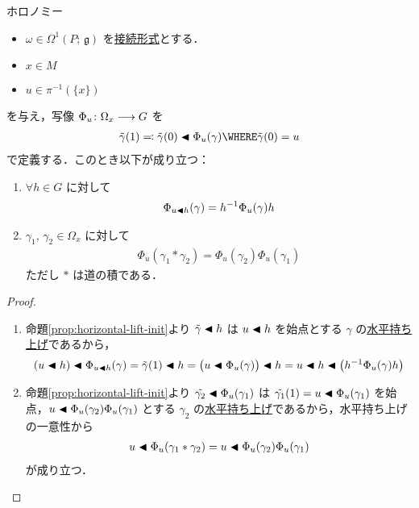 \documentclass[TQFT_main]{subfiles}
\begin{document}
\begin{myprop}[label=prop:holonomy]{ホロノミー}
    \begin{itemize}
        \item $\omega \in \Omega^1(P;\, \mathfrak{g})$ を\hyperref[def:connection]{接続形式}とする．
        \item $x \in M$
        \item $u \in \pi^{-1}(\{x\})$
    \end{itemize}
    を与え，写像 $\Phi_u \colon \Omega_x \longrightarrow G$ を
    \begin{align}
        \tilde{\gamma}(1) \eqqcolon \tilde{\gamma}(0) \btl \Phi_u (\gamma) \WHERE \tilde{\gamma}(0) = u
    \end{align}
    で定義する．このとき以下が成り立つ：
    \begin{enumerate}
        \item $\forall h \in G$ に対して
        \begin{align}
            \Phi_{u \blacktriangleleft h} (\gamma) = h^{-1} \Phi_u (\gamma) h
        \end{align}
        \item $\gamma_1,\, \gamma_2 \in \Omega_x$ に対して
        \begin{align}
            \Phi_u (\gamma_1 * \gamma_2) = \Phi_u (\gamma_2) \Phi_u (\gamma_1)
        \end{align}
        ただし $*$ は道の積である．
    \end{enumerate}
\end{myprop}

\begin{proof}
    \begin{enumerate}
        \item 命題\ref{prop:horizontal-lift-init}より $\tilde{\gamma} \blacktriangleleft h$ は $u \blacktriangleleft h$ を始点とする $\gamma$ の\hyperref[def:horizontal-lift-curve]{水平持ち上げ}であるから，
        \begin{align}
            (u \blacktriangleleft h) \blacktriangleleft \Phi_{u \blacktriangleleft h}(\gamma) = \tilde{\gamma} (1) \blacktriangleleft h = \bigl(u \blacktriangleleft \Phi_u(\gamma)\bigr) \blacktriangleleft h = u \blacktriangleleft h \blacktriangleleft \bigl( h^{-1} \Phi_u (\gamma) h \bigr) 
        \end{align}
        \item 命題\ref{prop:horizontal-lift-init}より $\tilde{\gamma_2} \blacktriangleleft \Phi_u(\gamma_1)$ は $\tilde{\gamma_1}(1) = u \blacktriangleleft \Phi_u(\gamma_1)$ を始点，$u \blacktriangleleft \Phi_u(\gamma_2) \Phi_u(\gamma_1)$ とする $\gamma_2$ の\hyperref[def:horizontal-lift-curve]{水平持ち上げ}であるから，水平持ち上げの一意性から
        \begin{align}
            u \blacktriangleleft \Phi_u (\gamma_1 * \gamma_2) = u \blacktriangleleft \Phi_u(\gamma_2) \Phi_u(\gamma_1)
        \end{align}
        が成り立つ．
    \end{enumerate}
\end{proof}
\end{document}
